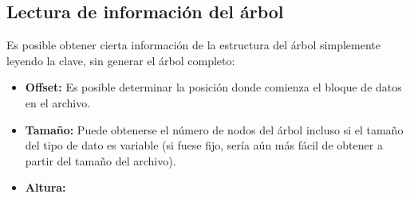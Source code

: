\documentclass{article}
\begin{document}
\subsection{Lectura de información del árbol}

Es posible obtener cierta información de la estructura del árbol simplemente 
leyendo la clave, sin generar el árbol completo:

\begin{itemize}
	\item \textbf{Offset:} Es posible determinar la posición donde comienza el 
	bloque de datos en el archivo. %
	\item \textbf{Tamaño:} Puede obtenerse el número de nodos del árbol incluso
	si el tamaño del tipo de dato es variable (si fuese fijo, sería aún más fácil 
	de obtener a partir del tamaño del archivo). %
	\item \textbf{Altura:} %
\end{itemize}
\end{document}
